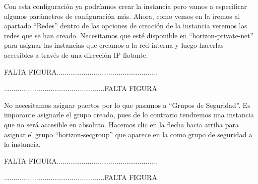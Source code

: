 Con esta configuración ya podríamos crear la instancia pero vamos a especificar algunos parámetros de configuración más. Ahora, como vemos en la %
iremos al apartado “Redes” dentro de las opciones de creación de la instancia veremos las redes que se han creado. Necesitamos que esté disponible en “horizon-private-net” para asignar las instancias que creamos a la red interna y luego hacerlas accesibles a través de una dirección IP flotante. 

\begin{tcolorbox}[colback=green!5!white,colframe=green!75!black]
FALTA FIGURA....................................................

....................................................FALTA FIGURA
\end{tcolorbox}

No necesitamos asignar puertos por lo que pasamos a “Grupos de Seguridad”. Es imporante asignarle el grupo creado, pues de lo contrario tendremos una instancia que no será accesible en absoluto. Hacemos clic en la flecha hacia arriba para asignar el grupo “horizon-secgroup” que aparece en la %
como grupo de seguridad a la instancia. 

\begin{tcolorbox}[colback=green!5!white,colframe=green!75!black]
FALTA FIGURA....................................................

....................................................FALTA FIGURA
\end{tcolorbox}


